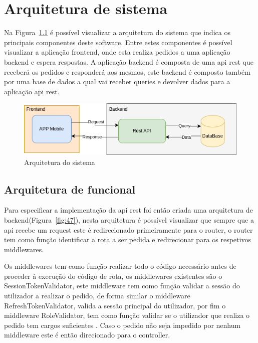 \chapter{Arquitetura de sistema}
Na Figura~\ref{fig:46} é possível visualizar a arquitetura do sistema que indica os principais 
componentes deste software. Entre estes componentes é possível visualizar a aplicação frontend, 
onde esta realiza pedidos a uma aplicação backend e espera respostas. A aplicação backend é composta 
de uma api rest que receberá os pedidos e responderá aos mesmos, este backend é composto também por 
uma base de dados a qual vai receber queries e devolver dados para a aplicação api rest.

\begin{figure}[htb]
    \centering
    
    \includegraphics[width=\textwidth]{images/Arquiteturas/arquitetura_de_solucao.png}
    \caption{Arquitetura do sistema}
    \label{fig:46}
\end{figure}

\newpage

\section{Arquitetura de funcional}

Para especificar a implementação da api rest foi então criada uma arquitetura de 
backend(Figura~\ref{fig:47}), nesta arquitetura é possível visualizar que sempre que a api 
recebe um request este é redirecionado primeiramente para o router, o router tem como função 
identificar a rota a ser pedida e redirecionar para os respetivos middlewares. 

Os middlewares tem como função realizar todo o código necessário antes de proceder à execução 
do código de rota, os middlewares existentes são o SessionTokenValidator, este middleware tem 
como função validar a sessão do utilizador a realizar o pedido, de forma similar o middleware 
RefreshTokenValidator, valida a sessão principal do utilizador, por fim o middleware RoleValidator, 
tem como função validar se o utilizador que realiza o pedido tem cargos suficientes . 
Caso o pedido não seja impedido por nenhum middleware este é então direcionado para o 
controller.

